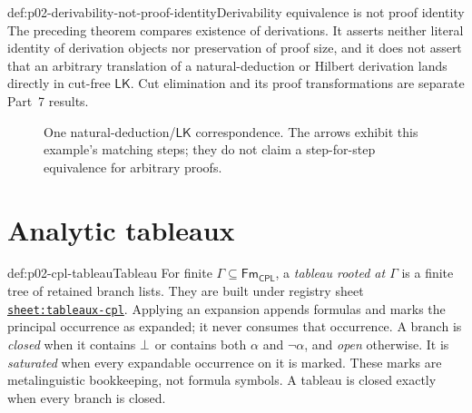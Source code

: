 \begin{hbwarning}{def:p02-derivability-not-proof-identity}{Derivability equivalence is not proof identity}
The preceding theorem compares existence of derivations.  It asserts neither
literal identity of derivation objects nor preservation of proof size, and it
does not assert that an arbitrary translation of a natural-deduction or
Hilbert derivation lands directly in cut-free \(\mathsf{LK}\).  Cut
elimination and its proof transformations are separate Part~7 results.
\end{hbwarning}

\begin{figure}[htbp]
\centering
{}
\caption{One natural-deduction/\(\mathsf{LK}\) correspondence.
The arrows exhibit this example's matching steps; they do not claim a
step-for-step equivalence for arbitrary proofs.}
\label{fig:p02-nd-lk-correspondence}
\end{figure}

\section{Analytic tableaux}
\label{sec:p02-analytic-tableaux}

\begin{hbdefinition}{def:p02-cpl-tableau}{Tableau}
For finite \(\Gamma\subseteq\mathsf{Fm}_{\mathsf{CPL}}\), a
\emph{tableau rooted at \(\Gamma\)} is a finite tree of retained branch
lists.  They are built under registry sheet
\hyperref[sheet:tableaux-cpl]{\texttt{sheet:tableaux-cpl}}.  Applying an
expansion appends formulas and marks the principal occurrence as expanded;
it never consumes that occurrence.  A branch is \emph{closed} when it
contains \(\bot\) or contains both \(\alpha\) and \(\neg\alpha\), and
\emph{open} otherwise.  It is \emph{saturated} when every expandable
occurrence on it is marked.  These marks are metalinguistic bookkeeping, not
formula symbols.  A tableau is closed exactly when every branch is closed.
\end{hbdefinition}


